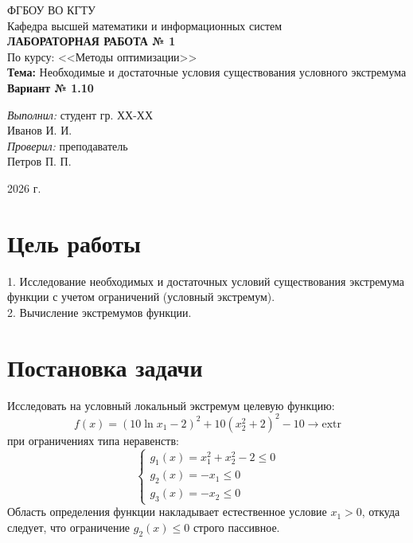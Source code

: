\documentclass[a4paper,12pt]{article}
\begin{document}
\begin{titlepage}
    \centering
    \vspace*{1cm}
    \large ФГБОУ ВО КГТУ \\
    \large Кафедра высшей математики и информационных систем \\
    \vspace{4cm}
    \Large \textbf{ЛАБОРАТОРНАЯ РАБОТА № 1} \\
    \large По курсу: <<Методы оптимизации>> \\
    \large \textbf{Тема:} Необходимые и достаточные условия существования условного экстремума \\
    \vspace{1cm}
    \large \textbf{Вариант № 1.10} \\
    \vspace{4cm}
    \begin{flushright}
        \large \textit{Выполнил:} студент гр. ХХ-ХХ \\
        Иванов И. И. \\
        \vspace{0.5cm}
        \textit{Проверил:} преподаватель \\
        Петров П. П. \\
    \end{flushright}
    \vfill
    2026 г.
\end{titlepage}

\newpage

\section{Цель работы}
1. Исследование необходимых и достаточных условий существования экстремума функции с учетом ограничений (условный экстремум).\\
2. Вычисление экстремумов функции.

\section{Постановка задачи}
Исследовать на условный локальный экстремум целевую функцию:
$$f(x) = (10\ln x_1 - 2)^2 + 10(x_2^2 + 2)^2 - 10 \rightarrow \text{extr}$$
при ограничениях типа неравенств:
$$\begin{cases}
    g_1(x) = x_1^2 + x_2^2 - 2 \le 0 \\
    g_2(x) = -x_1 \le 0 \\
    g_3(x) = -x_2 \le 0
\end{cases}$$
Область определения функции накладывает естественное условие $x_1 > 0$, откуда следует, что ограничение $g_2(x) \le 0$ строго пассивное.
\end{document}
